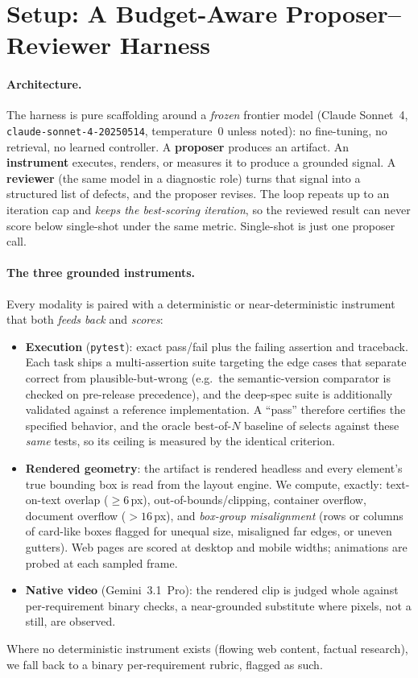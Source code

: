 \section{Setup: A Budget-Aware Proposer--Reviewer Harness}
\label{sec:method}

\paragraph{Architecture.} The harness is pure scaffolding around a \emph{frozen} frontier model (Claude Sonnet~4, \texttt{claude-sonnet-4-20250514}, temperature~$0$ unless noted): no fine-tuning, no retrieval, no learned controller. A \textbf{proposer} produces an artifact. An \textbf{instrument} executes, renders, or measures it to produce a grounded signal. A \textbf{reviewer} (the same model in a diagnostic role) turns that signal into a structured list of defects, and the proposer revises. The loop repeats up to an iteration cap and \emph{keeps the best-scoring iteration}, so the reviewed result can never score below single-shot under the same metric. Single-shot is just one proposer call.

\paragraph{The three grounded instruments.} Every modality is paired with a deterministic or near-deterministic instrument that both \emph{feeds back} and \emph{scores}:
\begin{itemize}[leftmargin=1.4em,itemsep=1pt,topsep=2pt]
\item \textbf{Execution} (\texttt{pytest}): exact pass/fail plus the failing assertion and traceback. Each task ships a multi-assertion suite targeting the edge cases that separate correct from plausible-but-wrong (e.g.\ the semantic-version comparator is checked on pre-release precedence), and the deep-spec suite is additionally validated against a reference implementation. A ``pass'' therefore certifies the specified behavior, and the oracle best-of-$N$ baseline of  selects against these \emph{same} tests, so its ceiling is measured by the identical criterion.
\item \textbf{Rendered geometry}: the artifact is rendered headless and every element's true bounding box is read from the layout engine. We compute, exactly: text-on-text overlap ($\ge 6$\,px), out-of-bounds/clipping, container overflow, document overflow ($>16$\,px), and \emph{box-group misalignment} (rows or columns of card-like boxes flagged for unequal size, misaligned far edges, or uneven gutters). Web pages are scored at desktop and mobile widths; animations are probed at each sampled frame.
\item \textbf{Native video} (Gemini~3.1~Pro): the rendered clip is judged whole against per-requirement binary checks, a near-grounded substitute where pixels, not a still, are observed.
\end{itemize}
Where no deterministic instrument exists (flowing web content, factual research), we fall back to a binary per-requirement rubric, flagged as such.

